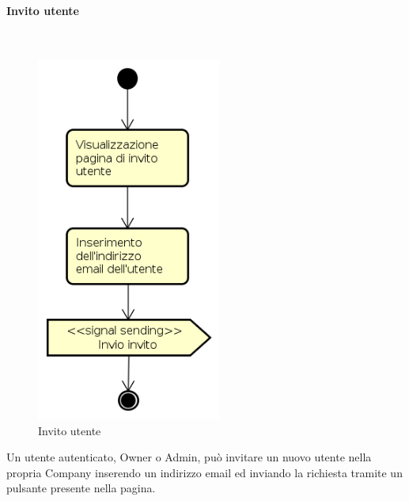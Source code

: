 \paragraph{Invito utente} \mbox{} \\
\begin{figure}[H]
\begin{center}
\includegraphics[height=12cm]{res/sections/backend/activities/invitoUtente.png}
\caption{Invito utente}
\end{center}
\end{figure}
Un utente autenticato, Owner o Admin, può invitare un nuovo utente nella propria Company inserendo un indirizzo email ed inviando la richiesta tramite un pulsante presente nella pagina.
\newpage
